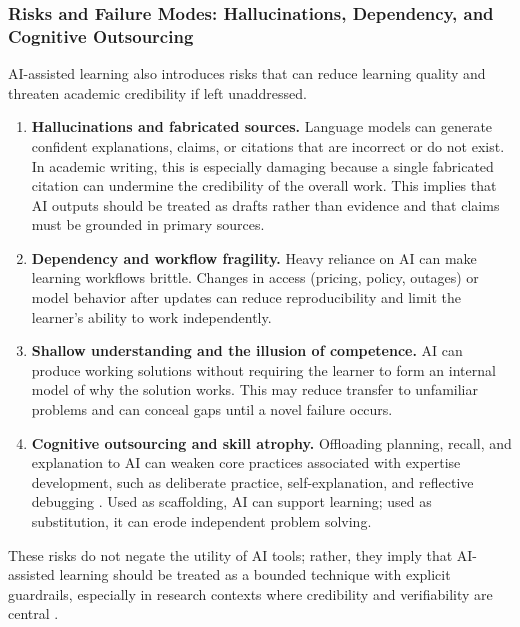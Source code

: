 \subsubsection{Risks and Failure Modes: Hallucinations, Dependency, and Cognitive Outsourcing}

AI-assisted learning also introduces risks that can reduce learning quality and threaten academic credibility if left unaddressed.

\begin{enumerate}
\item \textbf{Hallucinations and fabricated sources.} Language models can generate confident explanations, claims, or citations that are incorrect or do not exist. In academic writing, this is especially damaging because a single fabricated citation can undermine the credibility of the overall work. This implies that AI outputs should be treated as drafts rather than evidence and that claims must be grounded in primary sources.
\item \textbf{Dependency and workflow fragility.} Heavy reliance on AI can make learning workflows brittle. Changes in access (pricing, policy, outages) or model behavior after updates can reduce reproducibility and limit the learner's ability to work independently.
\item \textbf{Shallow understanding and the illusion of competence.} AI can produce working solutions without requiring the learner to form an internal model of why the solution works. This may reduce transfer to unfamiliar problems and can conceal gaps until a novel failure occurs.
\item \textbf{Cognitive outsourcing and skill atrophy.} Offloading planning, recall, and explanation to AI can weaken core practices associated with expertise development, such as deliberate practice, self-explanation, and reflective debugging \citep{ericsson1993}. Used as scaffolding, AI can support learning; used as substitution, it can erode independent problem solving.
\end{enumerate}

These risks do not negate the utility of AI tools; rather, they imply that AI-assisted learning should be treated as a bounded technique with explicit guardrails, especially in research contexts where credibility and verifiability are central \citep{bender2021}.
